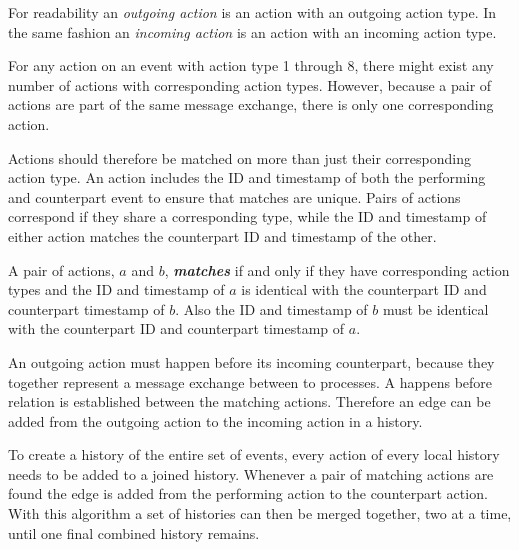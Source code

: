 	\newpar For readability an \textit{outgoing action} is an action with an outgoing action type. In the same fashion an \textit{incoming action} is an action with an incoming action type.
	
	\newpar For any action on an event with action type 1 through 8, there might exist any number of actions with corresponding action types. However, because a pair of actions are part of the same message exchange, there is only one corresponding action.
	
	Actions should therefore be matched on more than just their corresponding action type. An action includes the ID and timestamp of both the performing and counterpart event to ensure that matches are unique.
    Pairs of actions correspond if they share a corresponding type, while the ID and timestamp of either action matches the counterpart ID and timestamp of the other.
    
    \begin{definition}
    	\label{def:action:matching}
    	A pair of actions, $a$ and $b$, \textit{\textbf{matches}} if and only if they have corresponding action types and the ID and timestamp of $a$ is identical with the counterpart ID and counterpart timestamp of $b$. Also the ID and timestamp of $b$ must be identical with the counterpart ID and counterpart timestamp of $a$.
    \end{definition}
    
    \newpar An outgoing action must happen before its incoming counterpart, because they together represent a message exchange between to processes. A happens before relation is established between the matching actions. Therefore an edge can be added from the outgoing action to the incoming action in a history.

	\newpar To create a history of the entire set of events, every action of every local history needs to be added to a joined history. Whenever a pair of matching actions are found the edge is added from the performing action to the counterpart action. With this algorithm a set of histories can then be merged together, two at a time, until one final combined history remains.
    
